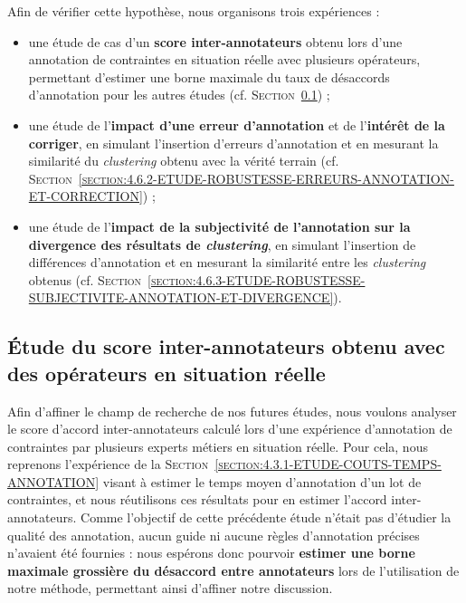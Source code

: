 	
	Afin de vérifier cette hypothèse, nous organisons trois expériences :
	\begin{itemize}
		\item une étude de cas d'un \textbf{score inter-annotateurs} obtenu lors d'une annotation de contraintes en situation réelle avec plusieurs opérateurs, permettant d'estimer une borne maximale du taux de désaccords d'annotation pour les autres études (cf. \textsc{Section~\ref{section:4.6.1-ETUDE-ROBUSTESSE-SCORE-ACCORD}}) ;
		\item une étude de l'\textbf{impact d'une erreur d'annotation} et de l'\textbf{intérêt de la corriger}, en simulant l'insertion d'erreurs d'annotation et en mesurant la similarité du \textit{clustering} obtenu avec la vérité terrain (cf. \textsc{Section~\ref{section:4.6.2-ETUDE-ROBUSTESSE-ERREURS-ANNOTATION-ET-CORRECTION}}) ;
		\item une étude de l'\textbf{impact de la subjectivité de l'annotation sur la divergence des résultats de \textit{clustering}}, en simulant l'insertion de différences d'annotation et en mesurant la similarité entre les \textit{clustering} obtenus (cf. \textsc{Section~\ref{section:4.6.3-ETUDE-ROBUSTESSE-SUBJECTIVITE-ANNOTATION-ET-DIVERGENCE}}).
	\end{itemize}
		
		
	\subsection{Étude du score inter-annotateurs obtenu avec des opérateurs en situation réelle}
	\label{section:4.6.1-ETUDE-ROBUSTESSE-SCORE-ACCORD}
		
		Afin d'affiner le champ de recherche de nos futures études, nous voulons analyser le score d'accord inter-annotateurs calculé lors d'une expérience d'annotation de contraintes par plusieurs experts métiers en situation réelle.
		Pour cela, nous reprenons l'expérience de la \textsc{Section~\ref{section:4.3.1-ETUDE-COUTS-TEMPS-ANNOTATION}} visant à estimer le temps moyen d'annotation d'un lot de contraintes, et nous réutilisons ces résultats pour en estimer l'accord inter-annotateurs.
		Comme l'objectif de cette précédente étude n'était pas d'étudier la qualité des annotation, aucun guide ni aucune règles d'annotation précises n'avaient été fournies : nous espérons donc pourvoir \textbf{estimer une borne maximale grossière du désaccord entre annotateurs} lors de l'utilisation de notre méthode, permettant ainsi d'affiner notre discussion.
		
